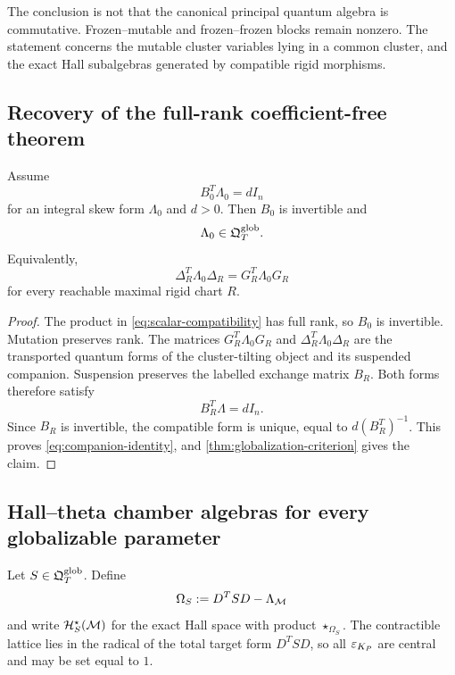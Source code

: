 \begin{remark}
The conclusion is not that the canonical principal quantum algebra is
commutative.  Frozen--mutable and frozen--frozen blocks remain nonzero.  The
statement concerns the mutable cluster variables lying in a common cluster,
and the exact Hall subalgebras generated by compatible rigid morphisms.
\end{remark}

\subsection{Recovery of the full-rank coefficient-free theorem}

\begin{corollary}
\label{cor:full-rank-globalizes}
Assume
\begin{equation}
 B_0^T\Lambda_0=dI_n
 \label{eq:scalar-compatibility}
\end{equation}
for an integral skew form $\Lambda_0$ and $d>0$.  Then $B_0$ is invertible and
\[
 \Lambda_0\in\mathfrak Q^{\mathrm{glob}}_T.
\]
Equivalently,
\begin{equation}
 \Delta_R^T\Lambda_0\Delta_R
 =G_R^T\Lambda_0G_R
 \label{eq:companion-identity}
\end{equation}
for every reachable maximal rigid chart $R$.
\end{corollary}

\begin{proof}
The product in \cref{eq:scalar-compatibility} has full rank, so $B_0$ is
invertible.  Mutation preserves rank.  The matrices
$G_R^T\Lambda_0G_R$ and
$\Delta_R^T\Lambda_0\Delta_R$ are the transported quantum forms of the
cluster-tilting object and its suspended companion.  Suspension preserves the
labelled exchange matrix $B_R$.  Both forms therefore satisfy
\[
 B_R^T\Lambda=dI_n.
\]
Since $B_R$ is invertible, the compatible form is unique, equal to
$d(B_R^T)^{-1}$.  This proves \cref{eq:companion-identity}, and
\cref{thm:globalization-criterion} gives the claim.
\end{proof}

\subsection{Hall--theta chamber algebras for every globalizable parameter}

Let $S\in\mathfrak Q^{\mathrm{glob}}_T$.  Define
\begin{equation}
 \Omega_S:=D^TSD-\Lambda_{\mathcal M}
 \label{eq:Omega-S}
\end{equation}
and write
$\mathcal H_S^\star(\mathcal M)$ for the exact Hall space with product
$\star_{\Omega_S}$.  The contractible lattice lies in the radical of the
total target form $D^TSD$, so all $\varepsilon_{K_P}$ are central and may be set
equal to $1$.


